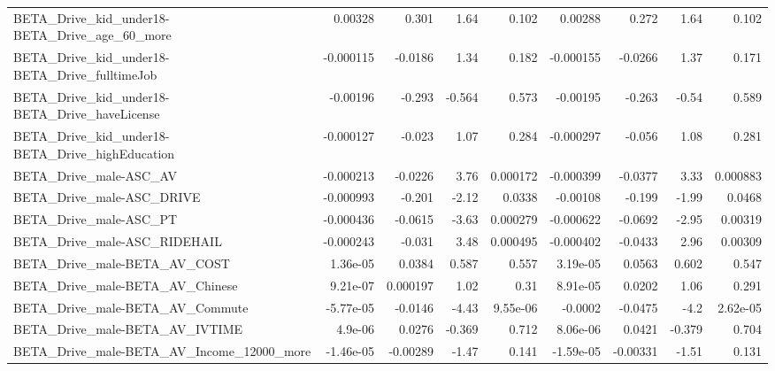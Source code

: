 \begin{tabular}{lrrrrrrrr}
BETA\_Drive\_kid\_under18-BETA\_Drive\_age\_60\_more      &     0.00328 &        0.301 &     1.64 &    0.102 &    0.00288 &       0.272 &         1.64 &         0.102 \\
BETA\_Drive\_kid\_under18-BETA\_Drive\_fulltimeJob      &   -0.000115 &      -0.0186 &     1.34 &    0.182 &  -0.000155 &     -0.0266 &         1.37 &         0.171 \\
BETA\_Drive\_kid\_under18-BETA\_Drive\_haveLicense      &    -0.00196 &       -0.293 &   -0.564 &    0.573 &   -0.00195 &      -0.263 &        -0.54 &         0.589 \\
BETA\_Drive\_kid\_under18-BETA\_Drive\_highEducation    &   -0.000127 &       -0.023 &     1.07 &    0.284 &  -0.000297 &      -0.056 &         1.08 &         0.281 \\
BETA\_Drive\_male-ASC\_AV                             &   -0.000213 &      -0.0226 &     3.76 & 0.000172 &  -0.000399 &     -0.0377 &         3.33 &      0.000883 \\
BETA\_Drive\_male-ASC\_DRIVE                          &   -0.000993 &       -0.201 &    -2.12 &   0.0338 &   -0.00108 &      -0.199 &        -1.99 &        0.0468 \\
BETA\_Drive\_male-ASC\_PT                             &   -0.000436 &      -0.0615 &    -3.63 & 0.000279 &  -0.000622 &     -0.0692 &        -2.95 &       0.00319 \\
BETA\_Drive\_male-ASC\_RIDEHAIL                       &   -0.000243 &       -0.031 &     3.48 & 0.000495 &  -0.000402 &     -0.0433 &         2.96 &       0.00309 \\
BETA\_Drive\_male-BETA\_AV\_COST                       &    1.36e-05 &       0.0384 &    0.587 &    0.557 &   3.19e-05 &      0.0563 &        0.602 &         0.547 \\
BETA\_Drive\_male-BETA\_AV\_Chinese                    &    9.21e-07 &     0.000197 &     1.02 &     0.31 &   8.91e-05 &      0.0202 &         1.06 &         0.291 \\
BETA\_Drive\_male-BETA\_AV\_Commute                    &   -5.77e-05 &      -0.0146 &    -4.43 & 9.55e-06 &    -0.0002 &     -0.0475 &         -4.2 &      2.62e-05 \\
BETA\_Drive\_male-BETA\_AV\_IVTIME                     &     4.9e-06 &       0.0276 &   -0.369 &    0.712 &   8.06e-06 &      0.0421 &       -0.379 &         0.704 \\
BETA\_Drive\_male-BETA\_AV\_Income\_12000\_more          &   -1.46e-05 &     -0.00289 &    -1.47 &    0.141 &  -1.59e-05 &    -0.00331 &        -1.51 &         0.131 \\

\end{tabular}
